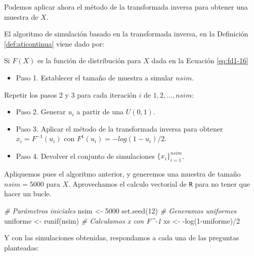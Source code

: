 \documentclass[
]{book}
\newenvironment{Shaded}{\begin{snugshade}}{\end{snugshade}}
\newcommand{\CommentTok}[1]{\textcolor[rgb]{0.56,0.35,0.01}{\textit{#1}}}
\newcommand{\DecValTok}[1]{\textcolor[rgb]{0.00,0.00,0.81}{#1}}
\newcommand{\FunctionTok}[1]{\textcolor[rgb]{0.00,0.00,0.00}{#1}}
\newcommand{\NormalTok}[1]{#1}
\newcommand{\OtherTok}[1]{\textcolor[rgb]{0.56,0.35,0.01}{#1}}
\newcommand{\SpecialCharTok}[1]{\textcolor[rgb]{0.00,0.00,0.00}{#1}}
\providecommand{\tightlist}{%
  \setlength{\itemsep}{0pt}\setlength{\parskip}{0pt}}
\newenvironment{silverbox}{
  \definecolor{shadecolor}{rgb}{192, 192, 192}  
  \color{black}
  \begin{shaded}}
 {\end{shaded}}
\theoremstyle{definition}
\theoremstyle{definition}
\theoremstyle{definition}
\theoremstyle{definition}
\theoremstyle{remark}
\begin{document}
Podemos aplicar ahora el método de la transformada inversa para obtener una muestra de \(X\).

El algoritmo de simulación basado en la transformada inversa, en la Definición \ref{def:aticontinua} viene dado por:

\begin{silverbox}

Si \(F(X)\) es la función de distribución para \(X\) dada en la Ecuación \eqref{eq:fd1-16}

\begin{itemize}
\tightlist
\item
  Paso 1. Establecer el tamaño de muestra a simular \(nsim\).
\end{itemize}

Repetir los pasos 2 y 3 para cada iteración \(i\) de \(1, 2,..., nsim\):

\begin{itemize}
\item
  Paso 2. Generar \(u_i\) a partir de una \(U(0,1)\).
\item
  Paso 3. Aplicar el método de la transformada inversa para obtener \(x_i = F^{-1}(u_i)\) con \(F^{1}(u_i) = -log(1-u_i)/2.\)
\item
  Paso 4. Devolver el conjunto de simulaciones \(\{x_i\}_{i=1}^{nsim}\).
\end{itemize}

\end{silverbox}

Apliquemos pues el algoritmo anterior, y generemos una muestra de tamaño \(nsim=5000\) para \(X\). Aprovechamos el calculo vectorial de \texttt{R} para no tener que hacer un bucle.

\begin{Shaded}
\begin{Highlighting}[]
\CommentTok{\# Parámetros iniciales}
\NormalTok{nsim }\OtherTok{\textless{}{-}} \DecValTok{5000}
\FunctionTok{set.seed}\NormalTok{(}\DecValTok{12}\NormalTok{)}
\CommentTok{\# Generamos uniformes }
\NormalTok{uniforme }\OtherTok{\textless{}{-}} \FunctionTok{runif}\NormalTok{(nsim)}
\CommentTok{\# Calculamos x con F\^{}{-}1}
\NormalTok{xs }\OtherTok{\textless{}{-}} \SpecialCharTok{{-}}\FunctionTok{log}\NormalTok{(}\DecValTok{1}\SpecialCharTok{{-}}\NormalTok{uniforme)}\SpecialCharTok{/}\DecValTok{2}
\end{Highlighting}
\end{Shaded}

Y con las simulaciones obtenidas, respondamos a cada una de las preguntas planteadas:
\end{document}
